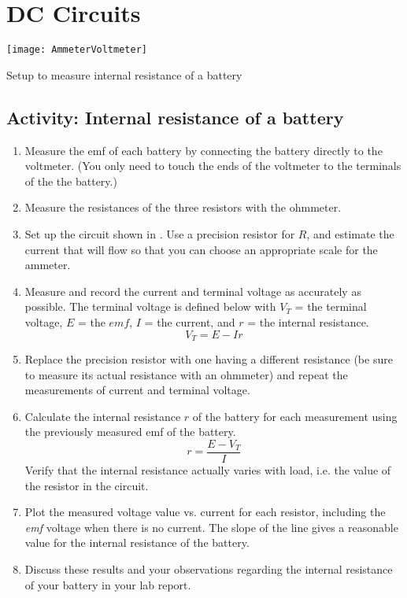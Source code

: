 \newpage
\section {DC Circuits}

\begin{marginfigure}
	\centering
	\texttt{[image: AmmeterVoltmeter]}%
	\caption{Setup to measure internal resistance of a battery}
	\label{f:vimtr}
\end{marginfigure}

\subsection{Activity: Internal resistance of a battery}
\begin{enumerate}
	\item Measure the emf of each battery by connecting the battery directly to the voltmeter. (You only need to touch the ends of the voltmeter to the terminals of the the battery.)
	\item Measure the resistances of the three resistors with the ohmmeter.
	\item Set up the circuit shown in .  Use a precision resistor for $R$, and estimate the current that will flow so that you can choose an appropriate scale for the ammeter.
	\item Measure and record the current and terminal voltage as accurately as possible. The terminal voltage is defined below with $V_T$ = the terminal voltage, $E$ = the $emf$, $I$ = the current, and $r$ = the internal resistance.
\begin{equation} \label{e:vterm}
	V_T  =  E -Ir 	%
\end{equation}
	\item Replace the precision resistor with one having a different resistance (be sure to measure its actual resistance with an ohmmeter) and repeat the measurements of current and terminal voltage.
	\item Calculate the internal resistance $r$ of the battery for each measurement using the previously measured emf of the battery. \[ r = \frac{E - V_T}{I} \]  Verify that the internal resistance actually varies with load, i.e. the value of the resistor in the circuit.
	\item Plot the measured voltage value vs. current for each resistor, including the \emph{emf} voltage when there is no current. The slope of the line gives a reasonable value for the internal resistance of the battery.
	\item Discuss these results and your observations regarding the internal resistance of your battery in your lab report.
\end{enumerate}


